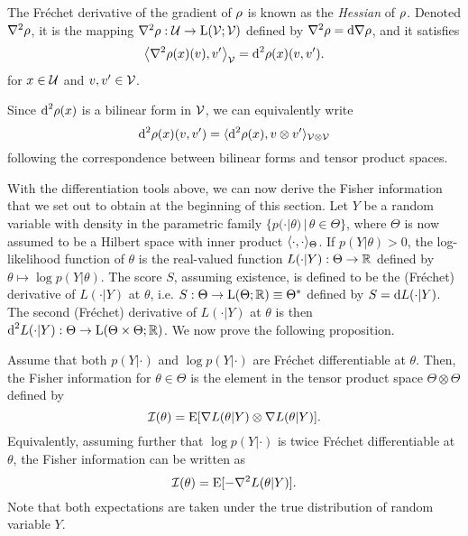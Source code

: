 \begin{definition}[Hessian]
  The Fréchet derivative of the gradient of $\rho$ is known as the \emph{Hessian} of $\rho$.
  Denoted $\nabla^2 \rho$, it is the mapping $\nabla^2 \rho : {\mathcal U} \to \text{L}({\mathcal V};{\mathcal V})$ defined by $\nabla^2 \rho  = \text{d} \nabla \rho$, and it satisfies
  \[
    \left\langle \nabla^2 \rho(x)(v) , v' \right\rangle_{\mathcal V} = \text{d}^2 \rho(x)(v,v').
  \]
  for $x\in{\mathcal U}$ and $v,v'\in{\mathcal V}$.
\end{definition}

\begin{remark}
  Since $\text{d}^2 \rho(x)$ is a bilinear form in ${\mathcal V}$, we can equivalently write
  \[
    \text{d}^2 \rho(x)(v,v') = \langle\text{d}^2 \rho(x), v \otimes v'\rangle_{{\mathcal V}\otimes{\mathcal V}}
  \]
  following the correspondence between bilinear forms and tensor product spaces.  
\end{remark}

With the differentiation tools above, we can now derive the Fisher information that we set out to obtain at the beginning of this section.
Let $Y$ be a random variable with density in the parametric family $\{p(\cdot|\theta) \,|\, \theta \in \Theta \}$, where $\Theta$ is now assumed to be a Hilbert space with inner product $\langle\cdot,\cdot\rangle_\Theta$.
If $p(Y|\theta) > 0$, the log-likelihood function of $\theta$ is the real-valued function $L(\cdot|Y):\Theta\to\mathbb{R}$ defined by $\theta \mapsto \log p(Y|\theta)$. 
The score $S$, assuming existence, is defined to be the (Fréchet) derivative of $L(\cdot|Y)$ at $\theta$, i.e. $S:\Theta \to \text{L}(\Theta;\mathbb{R}) \equiv \Theta^*$ defined by $S = \text{d} L(\cdot | Y)$.
The second (Fréchet) derivative of $L(\cdot|Y)$ at $\theta$ is then $\text{d}^2 L(\cdot|Y): \Theta \to \text{L}(\Theta \times \Theta;\mathbb{R})$.
We now prove the following proposition.

\begin{proposition}\label{thm:fisherinfohilbert}
  Assume that both $p(Y|\cdot)$ and $\log p(Y|\cdot)$ are Fréchet differentiable at $\theta$.
  Then, the Fisher information for $\theta\in\Theta$ is the element in the tensor product space $\Theta \otimes \Theta$ defined by
  \[
    {\mathcal I}(\theta) = \operatorname{E} [\nabla L(\theta|Y) \otimes \nabla L(\theta|Y)].
  \]  
  Equivalently, assuming further that $\log p(Y|\cdot)$ is twice Fréchet differentiable at $\theta$, the Fisher information can be written as
  \[
    {\mathcal I}(\theta) = \operatorname{E}[-\nabla^2 L(\theta|Y)].
  \]
  Note that both expectations are taken under the true distribution of random variable $Y$.
\end{proposition}

